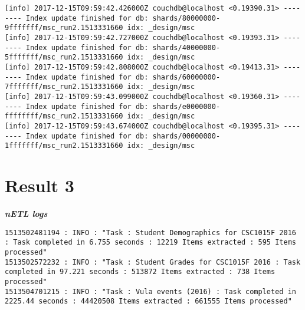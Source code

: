 \begin{verbatim}
[info] 2017-12-15T09:59:42.426000Z couchdb@localhost <0.19390.31> -------- Index update finished for db: shards/80000000-9fffffff/msc_run2.1513331660 idx: _design/msc
[info] 2017-12-15T09:59:42.727000Z couchdb@localhost <0.19393.31> -------- Index update finished for db: shards/40000000-5fffffff/msc_run2.1513331660 idx: _design/msc
[info] 2017-12-15T09:59:42.808000Z couchdb@localhost <0.19413.31> -------- Index update finished for db: shards/60000000-7fffffff/msc_run2.1513331660 idx: _design/msc
[info] 2017-12-15T09:59:43.099000Z couchdb@localhost <0.19360.31> -------- Index update finished for db: shards/e0000000-ffffffff/msc_run2.1513331660 idx: _design/msc
[info] 2017-12-15T09:59:43.674000Z couchdb@localhost <0.19395.31> -------- Index update finished for db: shards/00000000-1fffffff/msc_run2.1513331660 idx: _design/msc
\end{verbatim}


\section{Result 3}
\textit{\textbf{nETL logs}}
\begin{verbatim}
1513502481194 : INFO : "Task : Student Demographics for CSC1015F 2016 : Task completed in 6.755 seconds : 12219 Items extracted : 595 Items processed"
1513502572232 : INFO : "Task : Student Grades for CSC1015F 2016 : Task completed in 97.221 seconds : 513872 Items extracted : 738 Items processed"
1513504701215 : INFO : "Task : Vula events (2016) : Task completed in 2225.44 seconds : 44420508 Items extracted : 661555 Items processed"
\end{verbatim}

